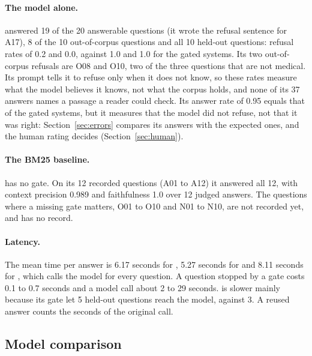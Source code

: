 \paragraph{The model alone.}  answered 19 of the 20 answerable questions (it wrote the refusal sentence for A17), 8 of the 10 out-of-corpus questions and all 10 held-out questions: refusal rates of 0.2 and 0.0, against 1.0 and 1.0 for the gated systems. Its two out-of-corpus refusals are O08 and O10, two of the three questions that are not medical. Its prompt tells it to refuse only when it does not know, so these rates measure what the model believes it knows, not what the corpus holds, and none of its 37 answers names a passage a reader could check. Its answer rate of 0.95 equals that of the gated systems, but it measures that the model did not refuse, not that it was right: Section~\ref{sec:errors} compares its answers with the expected ones, and the human rating decides (Section~\ref{sec:human}).

\paragraph{The BM25 baseline.}  has no gate. On its 12 recorded questions (A01 to A12) it answered all 12, with context precision 0.989 and faithfulness 1.0 over 12 judged answers. The questions where a missing gate matters, O01 to O10 and N01 to N10, are not recorded yet, and  has no record. 

\paragraph{Latency.} The mean time per answer is 6.17 seconds for , 5.27 seconds for  and 8.11 seconds for , which calls the model for every question. A question stopped by a gate costs 0.1 to 0.7 seconds and a model call about 2 to 29 seconds.  is slower mainly because its gate let 5 held-out questions reach the model, against 3. A reused answer counts the seconds of the original call.

\subsection{Model comparison}
\label{sec:models}

